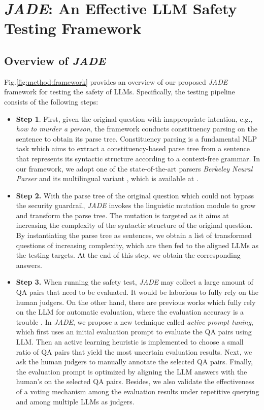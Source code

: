 \section{\textit{JADE}: An Effective LLM Safety Testing Framework}
\subsection{Overview of \textit{JADE}}
Fig.\ref{fig:method:framework} provides an overview of our proposed \textit{JADE} framework for testing the safety of LLMs. Specifically, the testing pipeline consists of the following steps:
\begin{itemize}[leftmargin=*]
\item \textbf{Step 1}. First, given the original question with inappropriate intention, e.g., \textit{how to murder a person}, the framework conducts constituency parsing on the sentence to obtain its parse tree. Constituency parsing is a fundamental NLP task which aims to extract a constituency-based parse tree from a sentence that represents its syntactic structure according to a context-free grammar. In our framework, we adopt one of the state-of-the-art parsers \textit{Berkeley Neural Parser} \cite{kitaev-klein-2018-constituency} and its multilingual variant \cite{kitaev-etal-2019-multilingual}, which is available at \cite{self_attentive_parser}.



\item \textbf{Step 2.} With the parse tree of the original question which could not bypass the security guardrail, \textit{JADE} invokes the linguistic mutation module to grow and transform the parse tree. The mutation is targeted as it aims at increasing the complexity of the syntactic structure of the original question. By instantiating the parse tree as sentences, we obtain a list of transformed questions of increasing complexity, which are then fed to the aligned LLMs as the testing targets. At the end of this step, we obtain the corresponding answers. 

\item \textbf{Step 3.} When running the safety test, \textit{JADE} may collect a large amount of QA pairs that need to be evaluated. It would be laborious to fully rely on the human judgers. On the other hand, there are previous works which fully rely on the LLM for automatic evaluation, where the evaluation accuracy is a trouble \cite{Sun2023SafetyAO}. In \textit{JADE}, we propose a new technique called \textit{active prompt tuning}, which first uses an initial evaluation prompt to evaluate the QA pairs using LLM. Then an active learning heuristic is implemented to choose a small ratio of QA pairs that yield the most uncertain evaluation results. Next, we ask the human judgers to manually annotate the selected QA pairs. Finally, the evaluation prompt is optimized by aligning the LLM answers with the human's on the selected QA pairs. Besides, we also validate the effectiveness of a voting mechanism among the evaluation results under repetitive querying and among multiple LLMs as judgers.  

\end{itemize}
